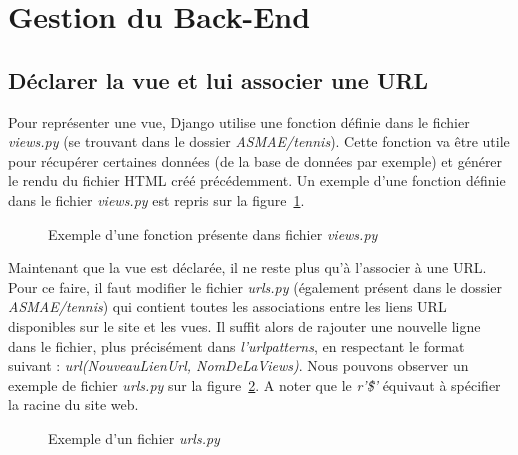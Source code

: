 \section{Gestion du Back-End}

\subsection{Déclarer la vue et lui associer une URL}

Pour représenter une vue, Django utilise une fonction définie dans le fichier \textit{views.py} (se trouvant dans le dossier \textit{ASMAE/tennis}). Cette fonction va être utile pour récupérer certaines données (de la base de données par exemple) et générer le rendu du fichier HTML créé précédemment. Un exemple d'une fonction définie dans le fichier \textit{views.py} est repris sur la figure~\ref{fig:Exemple d'une fonction présente dans le fichier views.py}. 

\begin{figure}[!ht]
\centering
\begin{framed}

\end{framed}
\caption{Exemple d'une fonction présente dans fichier \textit{views.py}}
\label{fig:Exemple d'une fonction présente dans le fichier views.py}
\end{figure}
\FloatBarrier

Maintenant que la vue est déclarée, il ne reste plus qu'à l'associer à une URL. Pour ce faire, il faut modifier le fichier \textit{urls.py} (également présent dans le dossier \textit{ASMAE/tennis}) qui contient toutes les associations entre les liens URL disponibles sur le site et les vues. Il suffit alors de rajouter une nouvelle ligne dans le fichier, plus précisément dans \textit{l'urlpatterns}, en respectant le format suivant : \textit{url(NouveauLienUrl, NomDeLaViews)}. Nous pouvons observer un exemple de fichier \textit{urls.py} sur la figure~\ref{fig:Exemple d'un fichier urls.py}. A noter que le \textit{r'\^\$'} équivaut à spécifier la racine du site web.

\begin{figure}[!ht]
\centering
\begin{framed}

\end{framed}
\caption{Exemple d'un fichier \textit{urls.py}}
\label{fig:Exemple d'un fichier urls.py}
\end{figure}
\FloatBarrier

